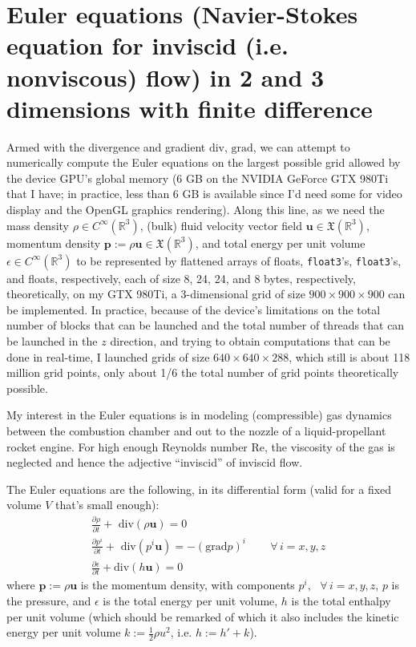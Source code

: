 \documentclass[10pt, landscape]{amsart}
\begin{document}
\pagebreak

\section{Euler equations (Navier-Stokes equation for inviscid (i.e. nonviscous) flow) in 2 and 3 dimensions with finite difference}

Armed with the divergence and gradient $\text{div}$, $\text{grad}$, we can attempt to numerically compute the Euler equations on the largest possible grid allowed by the device GPU's global memory (6 GB on the NVIDIA GeForce GTX 980Ti that I have; in practice, less than 6 GB is available since I'd need some for video display and the OpenGL graphics rendering).  Along this line, as we need the mass density $\rho \in C^{\infty}(\mathbb{R}^3)$, (bulk) fluid velocity vector field $\mathbf{u} \in \mathfrak{X}(\mathbb{R}^3)$, momentum density $\mathbf{p} := \rho \mathbf{u} \in \mathfrak{X}(\mathbb{R}^3)$, and total energy per unit volume $\epsilon \in C^{\infty}(\mathbb{R}^3)$ to be represented by flattened arrays of floats, \verb|float3|'s, \verb|float3|'s, and floats, respectively, each of size 8, 24, 24, and 8 bytes, respectively, theoretically, on my GTX 980Ti, a 3-dimensional grid of size $900\times 900 \times 900$ can be implemented.  In practice, because of the device's limitations on the total number of blocks that can be launched and the total number of threads that can be launched in the $z$ direction, and trying to obtain computations that can be done in real-time, I launched grids of size $640 \times 640 \times 288$, which still is about 118 million grid points, only about 1/6 the total number of grid points theoretically possible.

My interest in the Euler equations is in modeling (compressible) gas dynamics between the combustion chamber and out to the nozzle of a liquid-propellant rocket engine.  For high enough Reynolds number $\text{Re}$, the viscosity of the gas is neglected and hence the adjective ``inviscid'' of inviscid flow.

The Euler equations are the following, in its differential form (valid for a fixed volume $V$ that's small enough):
\begin{equation}
\begin{gathered}
  \frac{ \partial \rho }{ \partial t} + \text{ div}( \rho \mathbf{u} ) = 0 \\ 
  \frac{ \partial p^i }{ \partial t} + \text{ div}( p^i \mathbf{u} ) = - (\text{grad}p)^i \qquad \, \forall \, i = x,y,z \\
  \frac{ \partial \epsilon}{ \partial t} + \text{div}( h \mathbf{u} ) = 0
  \end{gathered}
  \end{equation}
where $\mathbf{p} := \rho \mathbf{u}$ is the momentum density, with components $p^i$, \, $\forall \, i = x,y,z$, $p$ is the pressure, and $\epsilon$ is the total energy per unit volume, $h$ is the total enthalpy per unit volume (which should be remarked of which it also includes the kinetic energy per unit volume $k:= \frac{1}{2} \rho u^2$, i.e. $h := h' + k$).
\end{document}
